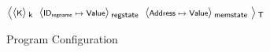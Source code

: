 \begin{figure}[t]
  \centering
  \renewcommand{\dotCt}[1]{\scriptstyle\s{#1}}
  \newcommand{\regstate}{\scriptstyle\s{ID}_\s{regname} \;\mapsto\; \s{Value}}
  \newcommand{\argc}{\scriptstyle\s{Int}}
  \newcommand{\argv}{\scriptstyle\s{Address}} 
  \newcommand{\entrypoint}{\scriptstyle\s{Address}}
  \newcommand{\codemem}{\scriptstyle\textit{Address} \;\mapsto\; \textit{Instruction}}
  \newcommand{\datamem}{\scriptstyle\s{Address} \;\mapsto\; \s{Value}}
  \newcommand{\bssmem}{\scriptstyle\textit{Address} \;\mapsto\; \textit{Value}}
  \newcommand{\stackmem}{\scriptstyle\textit{Address} \;\mapsto\; \textit{Value}}
  \newcommand{\heapmem}{\scriptstyle\textit{Address} \;\mapsto\; \textit{Value}}
$
\kall{T}{
  \begin{array}{@{}c@{}}
  \kall{k}{\dotCt{K}} \mathrel{}
  \mathrel{}
  \kall{regstate}{\regstate} \mathrel{}
  \mathrel{}
  \kall{memstate} {\datamem} \mathrel{}
  \mathrel{}
  \cmt{ 
  \kall{executionEnv}{ 
  \kall{commandineArgs}{
    \kall{argc}{\argc} \mathrel{}    
    \kall{argv}{\argv} \mathrel{}
  } \mathrel{}
  \kall{entryPoint}{\entrypoint} \mathrel{}
}}
  \end{array}
}
$
  \caption{Program Configuration}
  \label{fig:config}
\end{figure}
